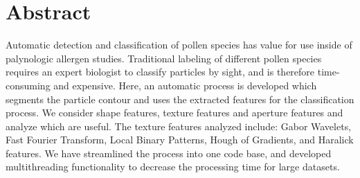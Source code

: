 \section{\textbf{Abstract}}


Automatic detection and classification of pollen species has value for use inside of palynologic allergen studies. Traditional labeling of different pollen species requires an expert biologist to classify particles by sight, and is therefore time-consuming and expensive. Here, an automatic process is developed which segments the particle contour and uses the extracted features for the classification process. We consider shape features, texture features and aperture features and analyze which are useful. The texture features analyzed include: Gabor Wavelets, Fast Fourier Transform, Local Binary Patterns, Hough of Gradients, and Haralick features. We have streamlined the process into one code base, and developed multithreading functionality to decrease the processing time for large datasets.
    
    
    